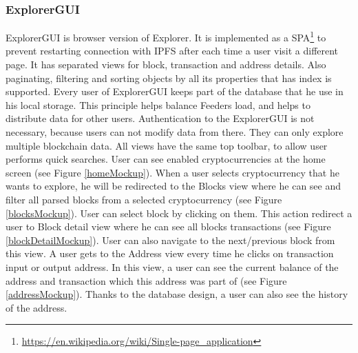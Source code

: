 \subsubsection{ExplorerGUI}
ExplorerGUI is browser version of Explorer. It is implemented as a SPA\footnote{\url{https://en.wikipedia.org/wiki/Single-page_application}} to prevent restarting connection with IPFS after each time a user visit a different page. It has separated views for block, transaction and address details. Also paginating, filtering and sorting objects by all its properties that has index is supported. Every user of ExplorerGUI keeps part of the database that he use in his local storage. This principle helps balance Feeders load, and helps to distribute data for other users.  Authentication to the ExplorerGUI is not necessary, because users can not modify data from there. They can only explore multiple blockchain data. All views have the same top toolbar, to allow user performs quick searches. User can see enabled cryptocurrencies at the home screen (see Figure \ref{homeMockup}). When a user selects cryptocurrency that he wants to explore, he will be redirected to the Blocks view where he can see and filter all parsed blocks from a selected cryptocurrency (see Figure \ref{blocksMockup}). User can select block by clicking on them. This action redirect a user to Block detail view where he can see all blocks transactions (see Figure \ref{blockDetailMockup}). User can also navigate to the next/previous block from this view. A user gets to the Address view every time he clicks on transaction input or output address. In this view, a user can see the current balance of the address and transaction which this address was part of (see Figure \ref{addressMockup}). Thanks to the database design, a user can also see the history of the address. 


